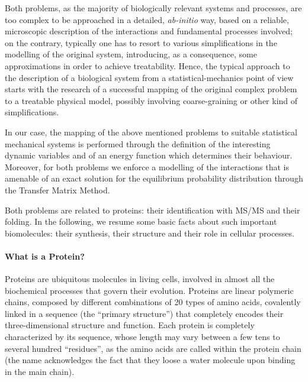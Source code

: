 Both problems, as the majority of  biologically relevant systems and processes,
are too complex to be approached in a detailed, \emph{ab-initio} way, based on a
reliable, microscopic description of the interactions and fundamental processes
involved; on the contrary, typically 
one has to resort to  %
various simplifications in the modelling of the original system, introducing, as
a consequence,  some approximations in order to achieve treatability. 
Hence,  the typical approach to the description of a biological system from a statistical-mechanics %
point of view starts with the research of a successful mapping of the
original complex problem to a treatable physical model, possibly involving coarse-graining or other kind of simplifications. 


In our case, the mapping of the above mentioned problems to 
suitable statistical mechanical systems is performed
through the definition of the interesting dynamic variables and of an
energy function which determines their behaviour.
Moreover, for both problems we enforce a modelling of the interactions that 
is amenable of an exact solution for the equilibrium
probability distribution through the Transfer Matrix Method.

Both problems are related to proteins: their identification with MS/MS and their folding. In the following, we resume some basic facts about such important biomolecules: their synthesis, their structure and their role in cellular processes.

\paragraph{What is a Protein?}
Proteins are ubiquitous molecules in living cells, involved in almost all the
biochemical processes that govern their evolution.
Proteins are linear polymeric  chains,
composed by different combinations of 20 types of amino acids, covalently linked  in a sequence (the ``primary structure'') that completely encodes their three-dimensional structure and function. 
Each protein is completely characterized by its sequence, whose length may vary
between a few tens to several hundred ``residues'', as the amino acids are
called within the protein chain (the name acknowledges the fact that  they loose
a water molecule upon binding in the main chain).
% 

